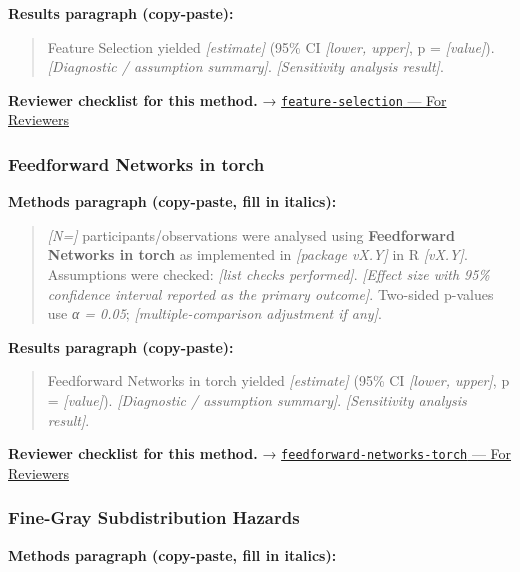 \documentclass[
]{article}
\begin{document}
\textbf{Results paragraph (copy-paste):}

\begin{quote}
Feature Selection yielded \emph{{[}estimate{]}} (95\% CI \emph{{[}lower,
upper{]}}, p = \emph{{[}value{]}}). \emph{{[}Diagnostic / assumption
summary{]}}. \emph{{[}Sensitivity analysis result{]}}.
\end{quote}

\textbf{Reviewer checklist for this method.} →
\href{../chapters/13-ml/feature-selection.Rmd\#for-reviewers}{\texttt{feature-selection}
--- For Reviewers}

\subsubsection{Feedforward Networks in
torch}\label{feedforward-networks-in-torch}

\textbf{Methods paragraph (copy-paste, fill in italics):}

\begin{quote}
\emph{{[}N={]}} participants/observations were analysed using
\textbf{Feedforward Networks in torch} as implemented in
\emph{{[}package vX.Y{]}} in R \emph{{[}vX.Y{]}}. Assumptions were
checked: \emph{{[}list checks performed{]}}. \emph{{[}Effect size with
95\% confidence interval reported as the primary outcome{]}}. Two-sided
p-values use \emph{α = 0.05}; \emph{{[}multiple-comparison adjustment if
any{]}}.
\end{quote}

\textbf{Results paragraph (copy-paste):}

\begin{quote}
Feedforward Networks in torch yielded \emph{{[}estimate{]}} (95\% CI
\emph{{[}lower, upper{]}}, p = \emph{{[}value{]}}). \emph{{[}Diagnostic
/ assumption summary{]}}. \emph{{[}Sensitivity analysis result{]}}.
\end{quote}

\textbf{Reviewer checklist for this method.} →
\href{../chapters/13-ml/feedforward-networks-torch.Rmd\#for-reviewers}{\texttt{feedforward-networks-torch}
--- For Reviewers}

\subsubsection{Fine-Gray Subdistribution
Hazards}\label{fine-gray-subdistribution-hazards}

\textbf{Methods paragraph (copy-paste, fill in italics):}
\end{document}
